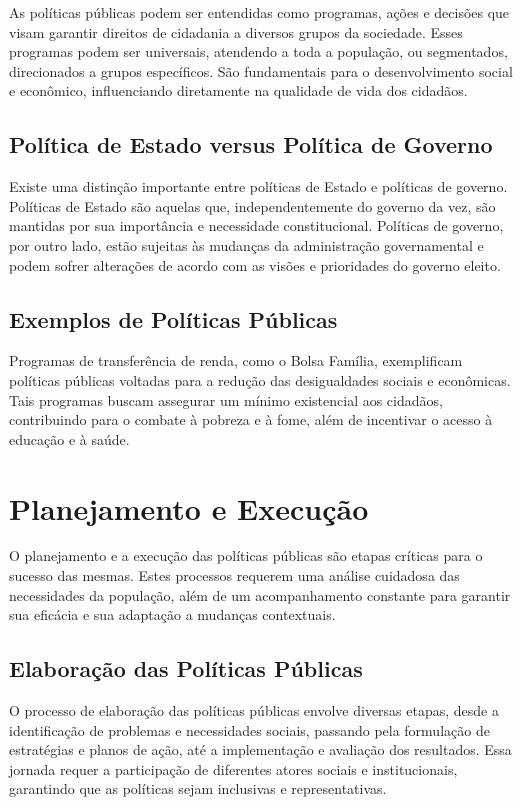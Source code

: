 \documentclass[
   article,       
   12pt,          
   oneside,       
   a4paper,       
   english,       
   brazil,        
   sumario=tradicional
   ]{abntex2}
\begin{document}
As políticas públicas podem ser entendidas como programas, ações e decisões que visam garantir direitos de cidadania a diversos grupos da sociedade. Esses programas podem ser universais, atendendo a toda a população, ou segmentados, direcionados a grupos específicos. São fundamentais para o desenvolvimento social e econômico, influenciando diretamente na qualidade de vida dos cidadãos.

\subsection{Política de Estado versus Política de Governo}

Existe uma distinção importante entre políticas de Estado e políticas de governo. Políticas de Estado são aquelas que, independentemente do governo da vez, são mantidas por sua importância e necessidade constitucional. Políticas de governo, por outro lado, estão sujeitas às mudanças da administração governamental e podem sofrer alterações de acordo com as visões e prioridades do governo eleito.

\subsection{Exemplos de Políticas Públicas}

Programas de transferência de renda, como o Bolsa Família, exemplificam políticas públicas voltadas para a redução das desigualdades sociais e econômicas. Tais programas buscam assegurar um mínimo existencial aos cidadãos, contribuindo para o combate à pobreza e à fome, além de incentivar o acesso à educação e à saúde.

\section{Planejamento e Execução}

O planejamento e a execução das políticas públicas são etapas críticas para o sucesso das mesmas. Estes processos requerem uma análise cuidadosa das necessidades da população, além de um acompanhamento constante para garantir sua eficácia e sua adaptação a mudanças contextuais.

\subsection{Elaboração das Políticas Públicas}

O processo de elaboração das políticas públicas envolve diversas etapas, desde a identificação de problemas e necessidades sociais, passando pela formulação de estratégias e planos de ação, até a implementação e avaliação dos resultados. Essa jornada requer a participação de diferentes atores sociais e institucionais, garantindo que as políticas sejam inclusivas e representativas.
\end{document}
